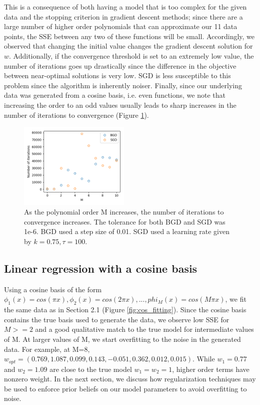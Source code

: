 \documentclass[10pt, twocolumn]{article}
\begin{document}
This is a consequence of both having a model that is too complex for the given data and the stopping criterion in gradient descent methods; since there are a large number of higher order polynomials that can approximate our 11 data points, the SSE between any two of these functions will be small. Accordingly, we observed that changing the initial value changes the gradient descent solution for $w$. Additionally, if the convergence threshold is set to an extremely low value, the number of iterations goes up drastically since the difference in the objective between near-optimal solutions is very low. SGD is less susceptible to this problem since the algorithm is inherently noiser. Finally, since our underlying data was generated from a cosine basis, i.e. even functions, we note that increasing the order to an odd values usually leads to sharp increases in the number of iterations to convergence (Figure \ref{fig:iter_vs_M}).

\begin{figure}
\caption{As the polynomial order M increases, the number of iterations to convergence increases. The tolerance for both BGD and SGD was 1e-6. BGD used a step size of 0.01. SGD used a learning rate given by $k=0.75, \tau=100$.}
\begin{center}
\includegraphics[width=200px]{iter_vs_M}
\end{center}
\label{fig:iter_vs_M}
\end{figure}

\subsection{Linear regression with a cosine basis}

Using a cosine basis of the form $\phi_1(x) = cos(\pi x), \phi_2(x) = cos(2\pi x), ... , phi_M(x) = cos(M\pi x)$, we fit the same data as in Section 2.1 (Figure \ref{fig:cos_fitting}). Since the cosine basis contains the true basis used to generate the data, we observe low SSE for $M>=2$ and a good qualitative match to the true model for intermediate values of M. At larger values of M, we start overfitting to the noise in the generated data. For example, at M=8, $w_{opt} =  (0.769, 1.087, 0.099, 0.143, -0.051, 0.362, 0.012, 0.015) $. While $w_1=0.77$ and $w_2=1.09$ are close to the true model $w_1 = w_2 = 1$, higher order terms have nonzero weight. In the next section, we discuss how regularization techniques may be used to enforce prior beliefs on our model parameters to avoid overfitting to noise.
\end{document}
